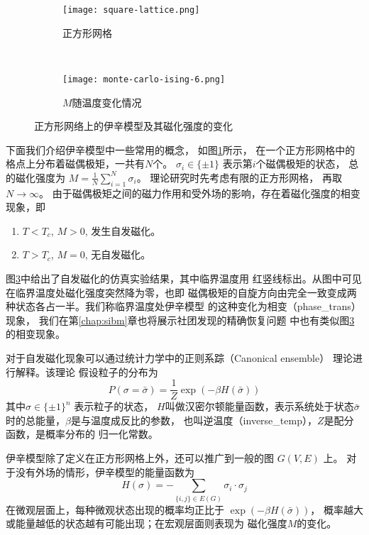 \begin{figure}
	\centering
	\begin{subfigure}{0.45\textwidth}
		\texttt{[image: square-lattice.png]}
		\caption{正方形网格}\label{fig:square_lattice}
	\end{subfigure}~
	\begin{subfigure}{0.53\textwidth}
		\texttt{[image: monte-carlo-ising-6.png]}
		\caption{$M$随温度变化情况}\label{fig:square_lattice_b}
	\end{subfigure}
  \caption{正方形网络上的伊辛模型及其磁化强度的变化}
\end{figure}

下面我们介绍伊辛模型中一些常用的概念，
如图\ref{fig:square_lattice}所示，
在一个正方形网格中的格点上分布着磁偶极矩，一共有$N$个。
$\sigma_i \in \{ \pm 1\} $ 表示第$i$个磁偶极矩的状态，
总的磁化强度为 $M = \frac{1}{N} \sum_{i=1}^N \sigma_i$。
理论研究时先考虑有限的正方形网格， 再取 $N\to \infty$。
由于磁偶极矩之间的磁力作用和受外场的影响，存在着磁化强度的相变现象，即
\begin{enumerate}
		\item $T< T_c$, $M>0$, 发生自发磁化。
		\item $T> T_c$, $M=0$, 无自发磁化。
\end{enumerate}

图\ref{fig:square_lattice_b}中给出了自发磁化的仿真实验结果，其中临界温度用
红竖线标出。从图中可见在临界温度处磁化强度突然降为零，也即
磁偶极矩的自旋方向由完全一致变成两种状态各占一半。我们称临界温度处伊辛模型
的这种变化为相变（\glsdesc{phase_trans}）现象，
我们在第\ref{chap:sibm}章也将展示社团发现的精确恢复问题
中也有类似图\ref{fig:square_lattice_b}的相变现象。

对于自发磁化现象可以通过统计力学中的正则系踪（Canonical ensemble）
理论进行解释。该理论
假设粒子的分布为
\begin{equation}\label{eq:canonical_ensemble}
P(\sigma = \bar{\sigma}) = \frac{1}{Z} \exp(-\beta H(\bar{\sigma}))
\end{equation}
其中$\sigma \in \{\pm 1\}^n$ 表示粒子的状态，
$H$叫做汉密尔顿能量函数，表示系统处于状态$\bar{\sigma}$时的总能量，$\beta$是与温度成反比的参数，
也叫逆温度（\glsdesc{inverse_temp}），$Z$是配分函数，是概率分布的
归一化常数。


伊辛模型除了定义在正方形网格上外，还可以推广到一般的图 $G(V, E)$ 上。
对于没有外场的情形，伊辛模型的能量函数为
\begin{equation}\label{eq:hamiltonian}
	H(\sigma) = -\sum_{\{i,j\} \in E(G)} \sigma_i \cdot \sigma_j
\end{equation}
在微观层面上，每种微观状态出现的概率均正比于 $\exp(-\beta H(\bar{\sigma}))$，
概率越大或能量越低的状态越有可能出现；在宏观层面则表现为
磁化强度$M$的变化。


